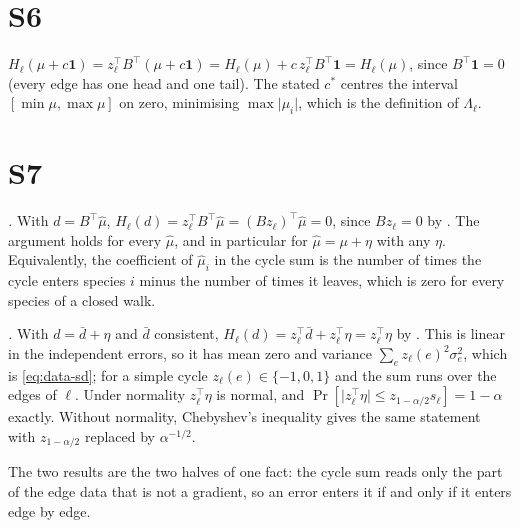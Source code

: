 \documentclass[11pt,a4paper]{article}
\theoremstyle{definition}
\theoremstyle{remark}
\newcommand{\abs}[1]{\lvert#1\rvert}
\newcommand{\hol}{H}
\begin{document}
\section*{S6}
$\hol_\ell(\mu+c\mathbf{1}) = z_\ell^{\top}B^{\top}(\mu+c\mathbf{1})
= \hol_\ell(\mu) + c\,z_\ell^{\top}B^{\top}\mathbf{1} = \hol_\ell(\mu)$,
since $B^{\top}\mathbf{1}=0$ (every edge has one head and one tail).
The stated $c^{\ast}$ centres the interval $[\min\mu,\max\mu]$ on zero,
minimising $\max\abs{\mu_i}$, which is the definition of $\Lambda_\ell$.

\section*{S7}
\emph{.} With $d=B^{\top}\hat\mu$,
$\hol_\ell(d)=z_\ell^{\top}B^{\top}\hat\mu=(Bz_\ell)^{\top}\hat\mu=0$,
since $Bz_\ell=0$ by . The argument holds for every
$\hat\mu$, and in particular for $\hat\mu=\mu+\eta$ with any $\eta$.
Equivalently, the coefficient of $\hat\mu_i$ in the cycle sum is the
number of times the cycle enters species $i$ minus the number of times
it leaves, which is zero for every species of a closed walk.

\emph{.} With $d=\bar d+\eta$ and $\bar d$
consistent, $\hol_\ell(d)=z_\ell^{\top}\bar d+z_\ell^{\top}\eta
=z_\ell^{\top}\eta$ by . This is linear in the
independent errors, so it has mean zero and variance
$\sum_e z_\ell(e)^{2}\sigma_e^{2}$, which is \eqref{eq:data-sd}; for a
simple cycle $z_\ell(e)\in\{-1,0,1\}$ and the sum runs over the edges of
$\ell$. Under normality $z_\ell^{\top}\eta$ is normal, and
$\Pr[\abs{z_\ell^{\top}\eta}\le z_{1-\alpha/2}s_\ell]=1-\alpha$ exactly.
Without normality, Chebyshev's inequality gives the same statement with
$z_{1-\alpha/2}$ replaced by $\alpha^{-1/2}$.

The two results are the two halves of one fact: the cycle sum reads only
the part of the edge data that is not a gradient, so an error enters it
if and only if it enters edge by edge.
\end{document}
